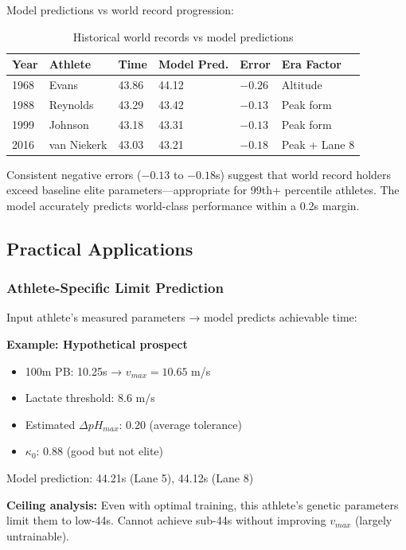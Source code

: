 Model predictions vs world record progression:

\begin{table}[H]
\centering
\caption{Historical world records vs model predictions}
\begin{tabular}{@{}llllll@{}}
\toprule
\textbf{Year} & \textbf{Athlete} & \textbf{Time} & \textbf{Model Pred.} & \textbf{Error} & \textbf{Era Factor} \\
\midrule
1968 & Evans & 43.86 & 44.12 & $-0.26$ & Altitude \\
1988 & Reynolds & 43.29 & 43.42 & $-0.13$ & Peak form \\
1999 & Johnson & 43.18 & 43.31 & $-0.13$ & Peak form \\
2016 & van Niekerk & 43.03 & 43.21 & $-0.18$ & Peak + Lane 8 \\
\bottomrule
\end{tabular}
\end{table}

Consistent negative errors ($-0.13$ to $-0.18$s) suggest that world record holders exceed baseline elite parameters—appropriate for 99th+ percentile athletes. The model accurately predicts world-class performance within a 0.2s margin.

\subsection{Practical Applications}

\subsubsection{Athlete-Specific Limit Prediction}

Input athlete's measured parameters → model predicts achievable time:

\textbf{Example: Hypothetical prospect}
\begin{itemize}
    \item 100m PB: 10.25s → $v_{max} = 10.65$ m/s
    \item Lactate threshold: 8.6 m/s
    \item Estimated $\Delta pH_{max}$: 0.20 (average tolerance)
    \item $\kappa_0$: 0.88 (good but not elite)
\end{itemize}

Model prediction: 44.21s (Lane 5), 44.12s (Lane 8)

\textbf{Ceiling analysis:} Even with optimal training, this athlete's genetic parameters limit them to low-44s. Cannot achieve sub-44s without improving $v_{max}$ (largely untrainable).

